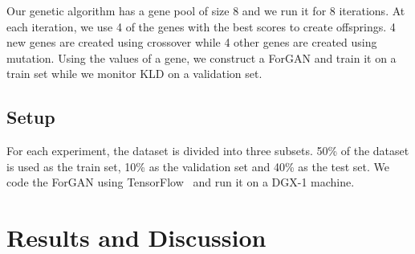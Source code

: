 \documentclass{ieeeaccess}
\begin{document}
Our genetic algorithm has a gene pool of size 8 and we run it for 8 iterations. At each iteration, we use 4 of the genes with the best scores to create offsprings. 4 new genes are created using crossover while 4 other genes are created using mutation. Using the values of a gene, we construct a ForGAN and train it on a train set while we monitor KLD on a validation set.

\subsection{Setup}

For each experiment, the dataset is divided into three subsets. 50\% of the dataset is used as the train set, 10\% as the validation set and 40\% as the test set. We code the ForGAN using TensorFlow~\cite{tensorflow2015-whitepaper} and run it on a DGX-1 machine.




\section{Results and Discussion}
\label{sec:results}
\end{document}
